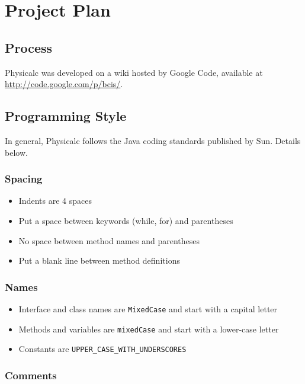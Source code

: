 \chapter{Project Plan}

\section{Process}

Physicalc was developed on a wiki hosted by Google Code, available at \\
\url{http://code.google.com/p/bcis/}.

\section{Programming Style}

In general, Physicalc follows the Java coding standards published by
Sun\cite{javastyle}.  Details below.

\subsection{Spacing}

\begin{itemize}
\item Indents are 4 spaces
\item Put a space between keywords (while, for) and parentheses
\item No space between method names and parentheses
\item Put a blank line between method definitions 
\end{itemize}

\subsection{Names}

\begin{itemize}
\item Interface and class names are \verb|MixedCase| and start with a capital letter
\item Methods and variables are \verb|mixedCase| and start with a lower-case letter
\item Constants are \verb|UPPER_CASE_WITH_UNDERSCORES|
\end{itemize}

\subsection{Comments}

